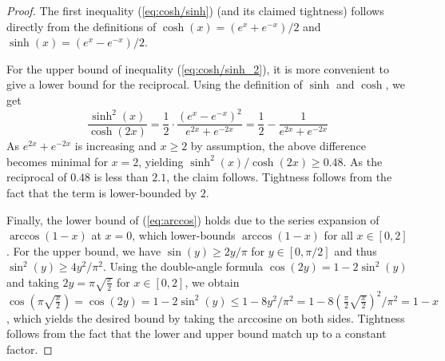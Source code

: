 \documentclass[a4paper,english,cleveref,thm-restate]{lipics-v2021}
\begin{document}
\begin{proof}
    The first inequality (\ref{eq:cosh/sinh}) (and its claimed tightness) follows directly from the definitions of $\cosh(x) = (e^x + e^{-x}) / 2$ and $\sinh(x) = (e^x - e^{-x}) / 2$.
    
    For the upper bound of inequality (\ref{eq:cosh/sinh_2}), it is more convenient to give a lower bound for the reciprocal.
    Using the definition of $\sinh$ and $\cosh$, we get
    \begin{equation*}
        \frac{\sinh^2(x)}{\cosh(2x)} =
        \frac{1}{2} \cdot \frac{(e^x - e^{-x})^2}{e^{2x} + e^{-2x}} =
        \frac{1}{2} - \frac{1}{e^{2x} + e^{-2x}}
    \end{equation*}
    As $e^{2x} + e^{-2x}$ is increasing and $x \ge 2$ by assumption, the above difference becomes minimal for $x = 2$, yielding $\sinh^2(x) / \cosh(2x) \ge 0.48$.  As the reciprocal of $0.48$ is less than $2.1$, the claim follows.  Tightness follows from the fact that the term is lower-bounded by $2$.
    
    Finally, the lower bound of (\ref{eq:arccos}) holds due to the series expansion of $ \arccos(1-x) $ at $ x = 0 $, which lower-bounds $ \arccos(1-x) $ for all $ x \in [0,2] $.
    For the upper bound, we have $ \sin(y) \geq 2y/\pi $ for $ y \in [0, \pi/2] $ and thus $ \sin^2(y) \geq 4y^2/\pi^2 $.
    Using the double-angle formula $ \cos(2y) = 1 - 2 \sin^2(y) $ and taking $ 2y = \pi \sqrt{\frac{x}{2}} $ for $ x \in [0, 2] $, we obtain 
    $ \cos(\pi \sqrt{\frac{x}{2}}) 
    = \cos(2y) 
    = 1 - 2 \sin^2(y) 
    \leq 1 - 8y^2/\pi^2
    = 1 - 8 (\frac{\pi}{2} \sqrt{\frac{x}{2}})^2 / \pi^2
    = 1 - x $,
    which yields the desired bound by taking the arccosine on both sides.  Tightness follows from the fact that the lower and upper bound match up to a constant factor.
\end{proof}
\end{document}
